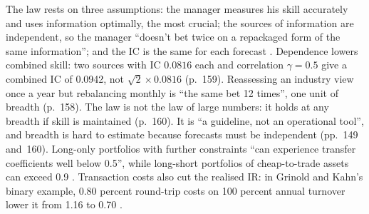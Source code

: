 \begin{qfresult}
 The law rests on three assumptions: the manager measures his skill accurately and uses information optimally, the most crucial; the sources of information are independent, so the manager ``doesn't bet twice on a repackaged form of the same information''; and the IC is the same for each forecast \citep[chap.~6, p.~162]{alpha-grinold}. Dependence lowers combined skill: two sources with IC $0.0816$ each and correlation $\gamma=0.5$ give a combined IC of 0.0942, not $\sqrt2\times0.0816$ (p.~159). Reassessing an industry view once a year but rebalancing monthly is ``the same bet 12 times'', one unit of breadth (p.~158). The law is not the law of large numbers: it holds at any breadth if skill is maintained (p.~160). It is ``a guideline, not an operational tool'', and breadth is hard to estimate because forecasts must be independent (pp.~149 and~160). Long-only portfolios with further constraints ``can experience transfer coefficients well below 0.5'', while long-short portfolios of cheap-to-trade assets can exceed 0.9 \citep[p.~29]{wide-grinold-kahn-advances}. Transaction costs also cut the realised IR: in Grinold and Kahn's binary example, 0.80 percent round-trip costs on 100 percent annual turnover lower it from 1.16 to 0.70 \citep[n.~4, p.~153]{alpha-grinold}.


\end{qfresult}

